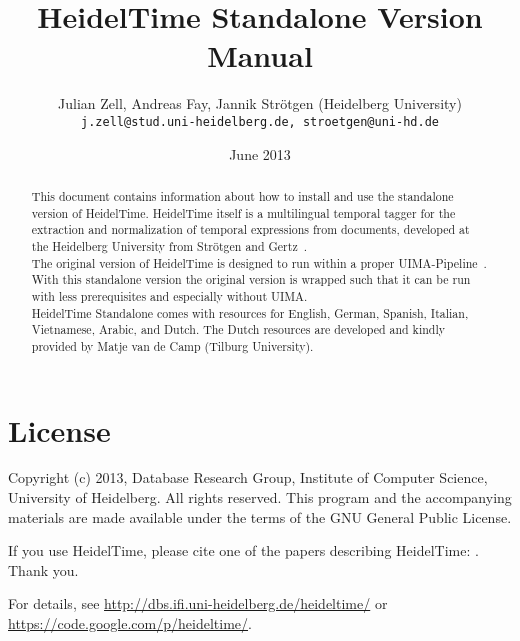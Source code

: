 \documentclass[
     11pt,         %
     a4paper,      %
     oneside,
     ]{article}
\newcommand{\languages}{English, German, Spanish, Italian, Vietnamese, Arabic, and Dutch}
\begin{document}
\title{%
HeidelTime Standalone Version\\
Manual
}
\author{Julian Zell, Andreas Fay, Jannik Str\"otgen (Heidelberg University)\\[0.2em]
\small \texttt{j.zell@stud.uni-heidelberg.de, stroetgen@uni-hd.de}
}
\date{June 2013}
\maketitle

\begin{abstract}
This document contains information about how to install and use the standalone version of HeidelTime. HeidelTime itself is a multilingual temporal tagger for the extraction and normalization of temporal expressions from documents, developed at the Heidelberg University from Str\"otgen and Gertz~\cite{Strotgen2010, HeidelTime, StroetgenGertz2012}.\\
The original version of HeidelTime is designed to run within a proper UIMA-Pipeline~\cite{UIMA}. With this standalone version the original version is wrapped such that it can be run with less prerequisites and especially without UIMA.\\
HeidelTime Standalone comes with resources for \languages. The Dutch resources are developed and kindly provided by Matje van de Camp (Tilburg University)\cite{Matje}.
\end{abstract}

\tableofcontents

%




\section{License}
Copyright (c) 2013, Database Research Group, Institute of Computer Science, University of Heidelberg. 
All rights reserved. This program and the accompanying materials 
are made available under the terms of the GNU General Public License.

If you use HeidelTime, please cite one of the papers describing HeidelTime: \cite{Strotgen2010, StroetgenGertz2012}. Thank you.

For details, see \url{http://dbs.ifi.uni-heidelberg.de/heideltime/} or \\
\url{https://code.google.com/p/heideltime/}.







\end{document}
